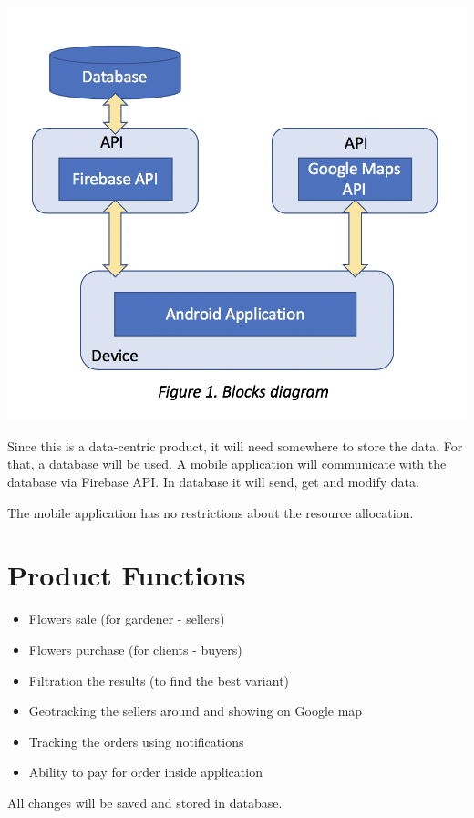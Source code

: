 \documentclass{scrreprt}
\begin{document}
\begin{center}
\includegraphics[scale=0.7]{blocks}
\end{center}
Since this is a data-centric product, it will need somewhere to store the data. For that, a database will be used. A mobile application will communicate with the database via Firebase API. In database it will send, get and modify data.

The mobile application has no restrictions about the resource allocation.

\section{Product Functions}
\begin{itemize}
\item Flowers sale (for gardener - sellers)
\item Flowers purchase (for clients - buyers)
\item Filtration the results (to find the best variant)
\item Geotracking the sellers around and showing on Google map
\item Tracking the orders using notifications
\item Ability to pay for order inside application
\end{itemize}

All changes will be saved and stored in database.  
\end{document}
